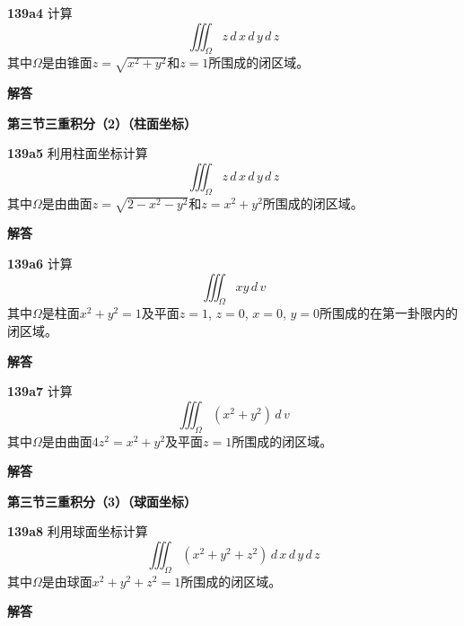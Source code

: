 \documentclass[a4paper,10pt]{article} %
\begin{document}

\textheight

\par\noindent \textbf{139a4} \quad 计算
$$ \iiint_{\Omega} z\,d\,x\,d\,y\,d\,z$$
其中$\Omega$是由锥面$z=\sqrt{x^2+y^2}$和$z=1$所围成的闭区域。
\par\noindent \textbf{ 解答}


\textheight

\newpage
\par\noindent \textbf{第三节\quad 三重积分（2）（柱面坐标）}
\par\noindent \textbf{139a5} \quad 利用柱面坐标计算
$$ \iiint_{\Omega} z\,d\,x\,d\,y\,d\,z$$
其中$\Omega$是由曲面$z=\sqrt{2-x^2-y^2}$和$z=x^2+y^2$所围成的闭区域。
\par\noindent \textbf{ 解答}



\textheight


\par\noindent \textbf{139a6} \quad 计算
$$ \iiint_{\Omega} xy\,d\,v$$
其中$\Omega$是柱面$x^2+y^2=1$及平面$z=1$, $z=0$, $x=0$, $y=0$所围成的在第一卦限内的闭区域。
\par\noindent \textbf{ 解答}


\textheight

\par\noindent \textbf{139a7} \quad 计算
$$ \iiint_{\Omega} \left(x^2+y^2\right)\,d\,v$$
其中$\Omega$是由曲面$4z^2=x^2+y^2$及平面$z=1$所围成的闭区域。
\par\noindent \textbf{ 解答}




\textheight

\newpage
\par\noindent \textbf{第三节\quad 三重积分（3）（球面坐标）}
\par\noindent \textbf{139a8} \quad 利用球面坐标计算
$$ \iiint_{\Omega} \left(x^2+y^2+z^2\right)\,d\,x\,d\,y\,d\,z$$
其中$\Omega$是由球面$x^2+y^2+z^2=1$所围成的闭区域。
\par\noindent \textbf{ 解答}
\end{document}
